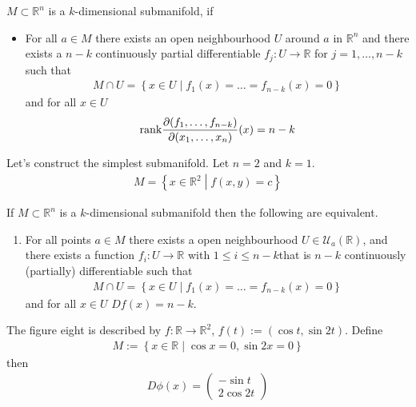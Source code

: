 \begin{definition}
    \(M \subset \mathbb{R}^n\) is a \(k\)-dimensional submanifold, if
    \begin{itemize}
        \item For all \(a \in M\) there exists an open neighbourhood \(U\) around \(a\) in \(\mathbb{R}^n\) and there exists a \(n - k\) continuously partial differentiable \(f_j : U \rightarrow \mathbb{R}\) for \(j = 1, \dots, n-k\) such that
        \begin{align}
            M \cap U = \left\{ x \in U \middle| f_1(x) = \dots = f_{n-k}(x) = 0 \right\}
        \end{align}
        and for all \(x \in U\)
        \begin{align}
            \text{rank} \frac{\partial (f_1, \dots, f_{n-k})}{\partial (x_1, \dots, x_n)}(x) = n-k
        \end{align}
    \end{itemize}
\end{definition}
%
\begin{example}
    Let's construct the simplest submanifold. Let \(n = 2\) and \(k = 1\).
    \begin{align}
        M = \left\{ x \in \mathbb{R}^2 \middle| f(x, y) = c \right\}
    \end{align}
\end{example}
%
\begin{theorem}
    If \(M \subset \mathbb{R}^n\) is a \(k\)-dimensional submanifold then the following are equivalent.
    \begin{enumerate}
        \item For all points \(a \in M\) there exists a open neighbourhood \(U \in \mathcal{U}_a(\mathbb{R})\), and there exists a function \(f_i: U \rightarrow \mathbb{R}\) with \(1 \leq i \leq n-k\)that is \(n-k\) continuously (partially) differentiable such that
        \begin{align}
            M \cap U = \left\{ x \in U \middle| f_1(x) = \dots = f_{n-k}(x) = 0 \right\}
        \end{align}
        and for all \(x \in U\) \(Df (x) = n-k\).
    \end{enumerate}
\end{theorem}
%
\begin{example}
    The figure eight is described by \(f: \mathbb{R} \rightarrow \mathbb{R}^2\), \(f(t):= (\cos t, \sin 2t)\). Define
    \begin{align}
        M := \left\{ x \in \mathbb{R} \middle | \cos x = 0, \sin 2x = 0 \right\}
    \end{align}
    then
    \begin{align}
        D\phi(x) = \begin{pmatrix}
            -\sin t \\
            2\cos 2t
        \end{pmatrix}
    \end{align}
\end{example}
